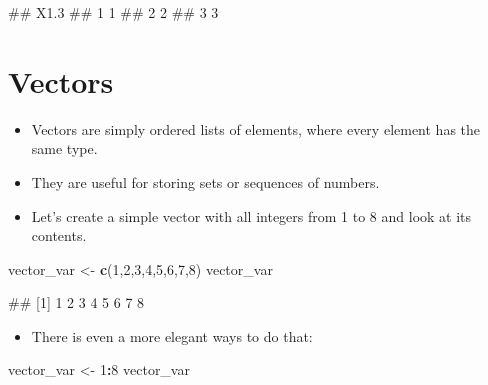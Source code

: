 \documentclass[
]{book}
\newenvironment{Shaded}{\begin{snugshade}}{\end{snugshade}}
\newcommand{\DecValTok}[1]{\textcolor[rgb]{0.00,0.00,0.81}{#1}}
\newcommand{\FunctionTok}[1]{\textcolor[rgb]{0.13,0.29,0.53}{\textbf{#1}}}
\newcommand{\NormalTok}[1]{#1}
\newcommand{\OtherTok}[1]{\textcolor[rgb]{0.56,0.35,0.01}{#1}}
\newcommand{\SpecialCharTok}[1]{\textcolor[rgb]{0.81,0.36,0.00}{\textbf{#1}}}
\providecommand{\tightlist}{%
  \setlength{\itemsep}{0pt}\setlength{\parskip}{0pt}}
\begin{document}
\begin{Shaded}
\begin{Highlighting}[]
\NormalTok{\#\#   X1.3}
\NormalTok{\#\# 1    1}
\NormalTok{\#\# 2    2}
\NormalTok{\#\# 3    3}
\end{Highlighting}
\end{Shaded}

\hypertarget{vectors}{%
\section{Vectors}\label{vectors}}

\begin{itemize}
\tightlist
\item
  Vectors are simply ordered lists of elements, where every element has the same type.
\item
  They are useful for storing sets or sequences of numbers.
\item
  Let's create a simple vector with all integers from 1 to 8 and look at its contents.
\end{itemize}

\begin{Shaded}
\begin{Highlighting}[]
\NormalTok{vector\_var }\OtherTok{\textless{}{-}} \FunctionTok{c}\NormalTok{(}\DecValTok{1}\NormalTok{,}\DecValTok{2}\NormalTok{,}\DecValTok{3}\NormalTok{,}\DecValTok{4}\NormalTok{,}\DecValTok{5}\NormalTok{,}\DecValTok{6}\NormalTok{,}\DecValTok{7}\NormalTok{,}\DecValTok{8}\NormalTok{)}
\NormalTok{vector\_var}
\end{Highlighting}
\end{Shaded}

\begin{Shaded}
\begin{Highlighting}[]
\NormalTok{\#\# [1] 1 2 3 4 5 6 7 8}
\end{Highlighting}
\end{Shaded}

\begin{itemize}
\tightlist
\item
  There is even a more elegant ways to do that:
\end{itemize}

\begin{Shaded}
\begin{Highlighting}[]
\NormalTok{vector\_var }\OtherTok{\textless{}{-}} \DecValTok{1}\SpecialCharTok{:}\DecValTok{8}
\NormalTok{vector\_var}
\end{Highlighting}
\end{Shaded}
\end{document}
